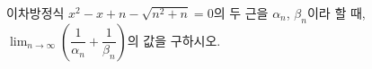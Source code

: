 이차방정식 $x^2-x+n-\sqrt{n^2+n}=0$의 두 근을 $\alpha_n$, $\beta_n$이라 할 때, $\displaystyle\lim_{n\to\infty}\left(\dfrac{1}{\alpha_n}+\dfrac{1}{\beta_n}\right)$의 값을 구하시오.

